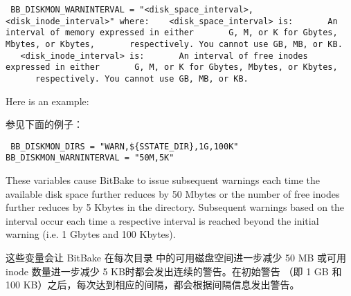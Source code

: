 {\begin{codeblock}
\footnotesize
\texttt{\noindent
BB\_DISKMON\_WARNINTERVAL = "<disk\_space\_interval>,<disk\_inode\_interval>" \linebreak
\linebreak
where: \linebreak
\linebreak
${}$\ \ \ <disk\_space\_interval> is: \linebreak
${}$\ \ \ \ \ \ An interval of memory expressed in either \linebreak
${}$\ \ \ \ \ \ G, M, or K for Gbytes, Mbytes, or Kbytes, \linebreak
${}$\ \ \ \ \ \ respectively. You cannot use GB, MB, or KB. \linebreak
\linebreak
${}$\ \ \ <disk\_inode\_interval> is: \linebreak
${}$\ \ \ \ \ \ An interval of free inodes expressed in either \linebreak
${}$\ \ \ \ \ \ G, M, or K for Gbytes, Mbytes, or Kbytes, \linebreak
${}$\ \ \ \ \ \ respectively. You cannot use GB, MB, or KB.
}
\end{codeblock}

\medskip
Here is an example:

\medskip
参见下面的例子：

\medskip
\begin{codeblock}
\footnotesize
\texttt{\noindent
BB\_DISKMON\_DIRS = "WARN,\$\{SSTATE\_DIR\},1G,100K" \linebreak
BB\_DISKMON\_WARNINTERVAL = "50M,5K"
}
\end{codeblock}

\medskip
These variables cause BitBake to issue subsequent warnings each time the available disk space further reduces by 50 Mbytes or the number of free inodes further reduces by 5 Kbytes in the  directory. Subsequent warnings based on the interval occur each time a respective interval is reached beyond the initial warning (i.e. 1 Gbytes and 100 Kbytes).

\medskip
这些变量会让 BitBake 在每次目录  中的可用磁盘空间进一步减少 50 MB 或可用 inode 数量进一步减少 5 KB时都会发出连续的警告。在初始警告 （即 1 GB 和 100 KB）之后，每次达到相应的间隔，都会根据间隔信息发出警告。

}

